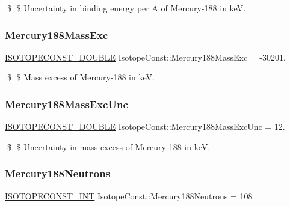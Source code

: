 \$ \$ Uncertainty in binding energy per A of Mercury-\/188 in keV. \mbox{\label{group___isotope_const-_mercury-_hg188_ga05cfe5774162ef8d5dcb30bf7e083282}} 
\subsubsection{\texorpdfstring{Mercury188\+Mass\+Exc}{Mercury188MassExc}}
{\footnotesize\ttfamily \mbox{\hyperlink{group___isotope_const-_macros_ga8f45a7272ce02c0b4c65c44636ed719a}{I\+S\+O\+T\+O\+P\+E\+C\+O\+N\+S\+T\+\_\+\+D\+O\+U\+B\+LE}} Isotope\+Const\+::\+Mercury188\+Mass\+Exc = -\/30201.}

\$ \$ Mass excess of Mercury-\/188 in keV. \mbox{\label{group___isotope_const-_mercury-_hg188_ga3cbe257596078fbfe0acbddd34a63a1d}} 
\subsubsection{\texorpdfstring{Mercury188\+Mass\+Exc\+Unc}{Mercury188MassExcUnc}}
{\footnotesize\ttfamily \mbox{\hyperlink{group___isotope_const-_macros_ga8f45a7272ce02c0b4c65c44636ed719a}{I\+S\+O\+T\+O\+P\+E\+C\+O\+N\+S\+T\+\_\+\+D\+O\+U\+B\+LE}} Isotope\+Const\+::\+Mercury188\+Mass\+Exc\+Unc = 12.}

\$ \$ Uncertainty in mass excess of Mercury-\/188 in keV. \mbox{\label{group___isotope_const-_mercury-_hg188_ga350fb9bb835652cefda7f1b52faead38}} 
\subsubsection{\texorpdfstring{Mercury188\+Neutrons}{Mercury188Neutrons}}
{\footnotesize\ttfamily \mbox{\hyperlink{group___isotope_const-_macros_ga5f18360b3e99483a35c32d789e62621c}{I\+S\+O\+T\+O\+P\+E\+C\+O\+N\+S\+T\+\_\+\+I\+NT}} Isotope\+Const\+::\+Mercury188\+Neutrons = 108}

